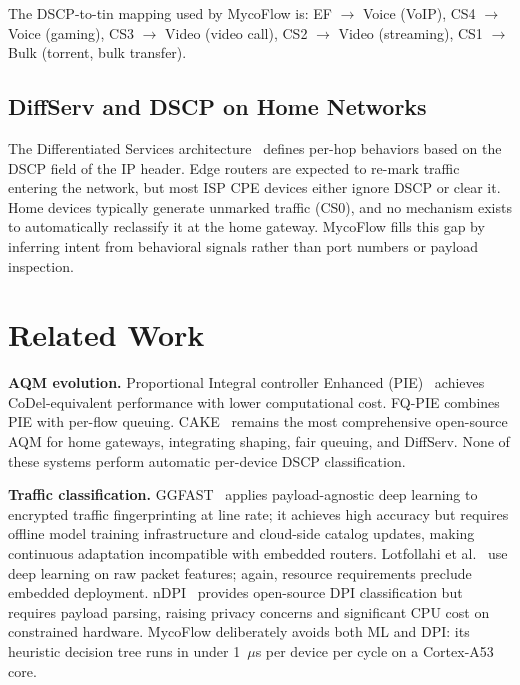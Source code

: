 \documentclass[conference]{IEEEtran}
\begin{document}
The DSCP-to-tin mapping used by MycoFlow is:
EF $\to$ Voice (VoIP),
CS4 $\to$ Voice (gaming),
CS3 $\to$ Video (video call),
CS2 $\to$ Video (streaming),
CS1 $\to$ Bulk (torrent, bulk transfer).

\subsection{DiffServ and DSCP on Home Networks}

The Differentiated Services architecture~\cite{rfc2474} defines
per-hop behaviors based on the DSCP field of the IP header.
Edge routers are expected to re-mark traffic entering the network, but most
ISP CPE devices either ignore DSCP or clear it.
Home devices typically generate unmarked traffic (CS0), and no mechanism
exists to automatically reclassify it at the home gateway.
MycoFlow fills this gap by inferring intent from behavioral signals rather
than port numbers or payload inspection.

\section{Related Work}
\label{sec:related}

\textbf{AQM evolution.}
Proportional Integral controller Enhanced (PIE)~\cite{pan2013pie} achieves
CoDel-equivalent performance with lower computational cost.
FQ-PIE combines PIE with per-flow queuing.
CAKE~\cite{cake2018} remains the most comprehensive open-source AQM
for home gateways, integrating shaping, fair queuing, and DiffServ.
None of these systems perform automatic per-device DSCP classification.

\textbf{Traffic classification.}
GGFAST~\cite{ggfast2023} applies payload-agnostic deep learning to encrypted
traffic fingerprinting at line rate; it achieves high accuracy but requires
offline model training infrastructure and cloud-side catalog updates,
making continuous adaptation incompatible with embedded routers.
Lotfollahi et al.~\cite{lotfollahi2020deep} use deep learning on raw packet
features; again, resource requirements preclude embedded deployment.
nDPI~\cite{ndpi2022} provides open-source DPI classification but requires
payload parsing, raising privacy concerns and significant CPU cost on
constrained hardware.
MycoFlow deliberately avoids both ML and DPI: its heuristic decision tree
runs in under 1~$\mu$s per device per cycle on a Cortex-A53 core.
\end{document}

